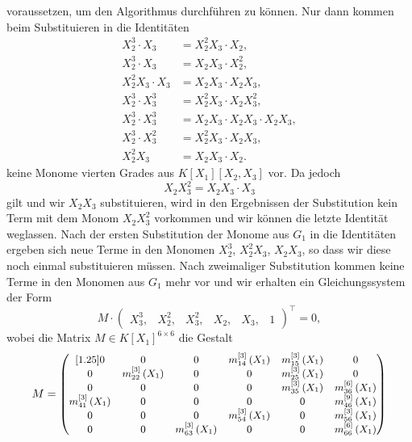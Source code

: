 \documentclass[a4paper,oneside, 11pt, openany%
]{article}
\theoremstyle{custom}
\theoremstyle{custom}
\begin{document}
	voraussetzen, um den Algorithmus durchführen zu können.
	Nur dann kommen beim Substituieren in die Identitäten
	\begin{equation}
		\begin{alignedat}{1}
			X_{2}^{3}\cdot X_{3}	&=  X_{2}^{2}X_{3}\cdot X_{2}, \\
			X_{2}^{3}\cdot X_{3} &=  X_{2}X_{3}\cdot X_{2}^2, \\
			X_{2}^{2}X_{3} \cdot X_{3}	&= X_{2}X_{3} \cdot X_{2}X_{3}, \\
			X_{2}^{3}\cdot X_{3}^3 	&=  X_{2}^{2}X_{3}\cdot X_{2}X_{3}^2, \\
			X_{2}^{3}\cdot X_{3}^3	&=  X_{2}X_{3} \cdot X_{2}X_{3} \cdot X_{2}X_{3}, \\
			X_{2}^{3}\cdot X_{3}^2 	&=  X_{2}^{2}X_{3}\cdot X_{2}X_{3},\\
			X_{2}^{2} X_{3} 	&=  X_{2}X_{3}\cdot X_{2}.
		\end{alignedat}
	\end{equation}
	keine Monome vierten Grades aus $K[X_1][X_2,X_3]$ vor.
	Da jedoch 
	\begin{equation}
		X_{2}X_{3}^2 = X_{2}X_{3} \cdot X_{3}
	\end{equation}
	gilt und wir $X_{2}X_{3}$ substituieren, wird in den Ergebnissen der Substitution kein Term mit dem Monom $X_{2}X_{3}^2$ vorkommen und wir können die letzte Identität weglassen.
	Nach der ersten Substitution der Monome aus $G_1$ in die Identitäten ergeben sich neue Terme in den Monomen $X_{2}^3$, $X_{2}^2X_{3}$, $X_{2}X_{3}$, so dass wir diese noch einmal substituieren müssen.
	Nach zweimaliger Substitution kommen keine Terme in den Monomen aus $G_1$ mehr vor und wir erhalten ein Gleichungssystem der Form
	\begin{equation}
		M \cdot
		\begin{pmatrix}
			X_{3}^3,&
			X_{2}^2,&
			X_{3}^2,&
			X_{2},&
			X_{3},&
			1
		\end{pmatrix}^{\top}=0,
	\end{equation} 
	wobei die Matrix $M \in K[X_1]^{6 \times 6}$ die Gestalt
	\begin{equation}
		\small
		M = \begin{pmatrix}[1.25]
			0 & 0 & 0 & m_{14}^{\left[ 3\right]}\left( X_{1}\right) & m_{15}^{\left[ 3\right]}\left( X_{1}\right) & 0\\
			0 & m_{22}^{\left[ 3\right]}\left( X_{1}\right) & 0 & 0 & m_{25}^{\left[ 3\right]}\left( X_{1}\right) & 0\\
			0 & 0 & 0 & 0 &  m_{35}^{\left[ 3\right]}\left( X_{1}\right) &  m_{36}^{\left[ 6\right]}\left( X_{1}\right)
			\\  m_{41}^{\left[ 3\right]}\left( X_{1}\right) & 0 & 0 & 0 & 0 &  m_{46}^{\left[ 9\right]}\left( X_{1}\right)\\ 0 & 0 & 0 &  m_{54}^{\left[ 3\right]}\left( X_{1}\right) & 0 &  m_{56}^{\left[ 3\right]}\left( X_{1}\right)\\ 0 & 0 &  m_{63}^{\left[ 3\right]}\left( X_{1}\right) & 0 & 0 & m_{66}^{\left[ 6\right]}\left( X_{1}\right)
		\end{pmatrix}
	\end{equation}
\end{document}
